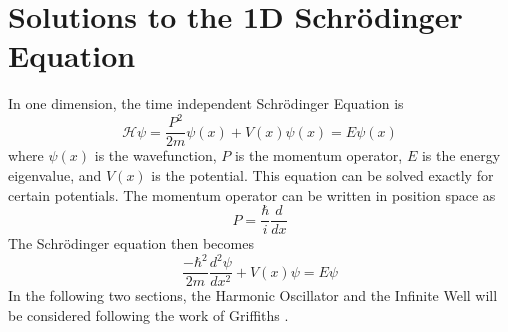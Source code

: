 \chapter{Solutions to the 1D Schr\"odinger Equation}
In one dimension, the time independent Schr\"odinger Equation is
\begin{equation}
    \mathcal{H}\psi=\frac{P^2}{2m}\psi(x)+V(x)\psi(x)=E\psi(x)
\end{equation}
where $\psi(x)$ is the wavefunction, $P$ is the momentum operator, $E$ is the energy eigenvalue, and $V(x)$ is the potential. This equation can be solved exactly for certain potentials. The momentum operator can be written in position space as 
\begin{equation}
P=\frac{\hbar}{i}\frac{d}{dx}    
\end{equation}
The Schr\"odinger equation then becomes
\begin{equation}
    \frac{-\hbar^2}{2m}\frac{d^2 \psi}{dx^2} + V(x) \psi=E\psi
\end{equation}
In the following two sections, the Harmonic Oscillator and the Infinite Well will be considered following the work of Griffiths \cite{Griffiths}.
